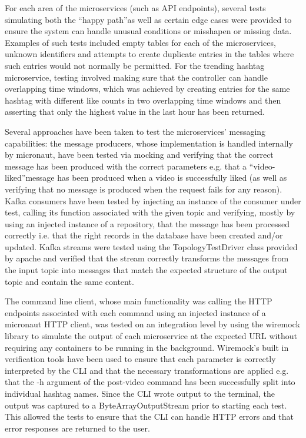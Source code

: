 \documentclass[parskip=full]{article}
\begin{document}
    For each area of the microservices (such as API endpoints), several tests simulating both the ``happy path''as well as certain edge cases were provided to ensure the system can handle unusual conditions or misshapen or missing data.
    Examples of such tests included empty tables for each of the microservices, unknown identifiers and attempts to create duplicate entries in the tables where such entries would not normally be permitted.
    For the trending hashtag microservice, testing involved making sure that the controller can handle overlapping time windows, which was achieved by creating entries for the same hashtag with different like counts in two overlapping time windows and then asserting that only the highest value in the last hour has been returned.

    Several approaches have been taken to test the microservices' messaging capabilities: the message producers, whose implementation is handled internally by micronaut, have been tested via mocking and verifying that the correct message has been produced with the correct parameters e.g. that a ``video-liked''message has been produced when a video is successfully liked (as well as verifying that no message is produced when the request fails for any reason).
    Kafka consumers have been tested by injecting an instance of the consumer under test, calling its function associated with the given topic and verifying, mostly by using an injected instance of a repository, that the message has been processed correctly i.e. that the right records in the database have been created and/or updated.
    Kafka streams were tested using the TopologyTestDriver class provided by apache \cite{topologyTestDriver} and verified that the stream correctly transforms the messages from the input topic into messages that match the expected structure of the output topic and contain the same content.

    The command line client, whose main functionality was calling the HTTP endpoints associated with each command using an injected instance of a micronaut HTTP client, was tested on an integration level by using the wiremock \cite{wiremock} library to simulate the output of each microservice at the expected URL without requiring any containers to be running in the background.
    Wiremock's built in verification tools have been used to ensure that each parameter is correctly interpreted by the CLI and that the necessary transformations are applied e.g. that the -h argument of the post-video command has been successfully split into individual hashtag names.
    Since the CLI wrote output to the terminal, the output was captured to a ByteArrayOutputStream prior to starting each test.
    This allowed the tests to ensure that the CLI can handle HTTP errors and that error responses are returned to the user.
\end{document}
